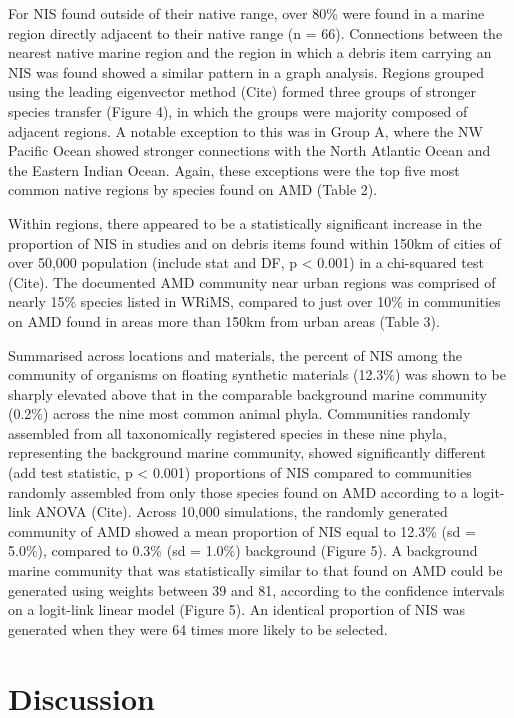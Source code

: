 \documentclass[a4paper, nobind]{templates/ociamthesis}
\begin{document}
For NIS found outside of their native range, over 80\% were found in a marine region directly adjacent to their native range (n = 66). Connections between the nearest native marine region and the region in which a debris item carrying an NIS was found showed a similar pattern in a graph analysis. Regions grouped using the leading eigenvector method (Cite) formed three groups of stronger species transfer (Figure 4), in which the groups were majority composed of adjacent regions. A notable exception to this was in Group A, where the NW Pacific Ocean showed stronger connections with the North Atlantic Ocean and the Eastern Indian Ocean. Again, these exceptions were the top five most common native regions by species found on AMD (Table 2).

Within regions, there appeared to be a statistically significant increase in the proportion of NIS in studies and on debris items found within 150km of cities of over 50,000 population (include stat and DF, p \textless{} 0.001) in a chi-squared test (Cite). The documented AMD community near urban regions was comprised of nearly 15\% species listed in WRiMS, compared to just over 10\% in communities on AMD found in areas more than 150km from urban areas (Table 3).

Summarised across locations and materials, the percent of NIS among the community of organisms on floating synthetic materials (12.3\%) was shown to be sharply elevated above that in the comparable background marine community (0.2\%) across the nine most common animal phyla. Communities randomly assembled from all taxonomically registered species in these nine phyla, representing the background marine community, showed significantly different (add test statistic, p \textless{} 0.001) proportions of NIS compared to communities randomly assembled from only those species found on AMD according to a logit-link ANOVA (Cite). Across 10,000 simulations, the randomly generated community of AMD showed a mean proportion of NIS equal to 12.3\% (sd = 5.0\%), compared to 0.3\% (sd = 1.0\%) background (Figure 5). A background marine community that was statistically similar to that found on AMD could be generated using weights between 39 and 81, according to the confidence intervals on a logit-link linear model (Figure 5). An identical proportion of NIS was generated when they were 64 times more likely to be selected.

\hypertarget{discussion-1}{%
\section{Discussion}\label{discussion-1}}
\end{document}
